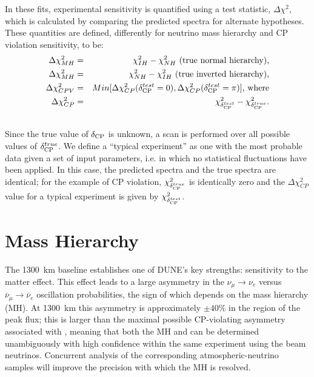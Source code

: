 In these fits, experimental sensitivity is
quantified using a test statistic, $\Delta\chi^2$, which is calculated
by comparing the predicted spectra for alternate hypotheses.
These quantities are defined, differently for neutrino mass hierarchy
and CP violation sensitivity, to be:
\begin{eqnarray}
\Delta\chi^2_{MH} & = & \chi^2_{IH} - \chi^2_{NH}\textrm{ (true normal hierarchy),}\\ 
\Delta\chi^2_{MH} & = & \chi^2_{NH} - \chi^2_{IH}\textrm{ (true inverted hierarchy),}\\
\Delta\chi^2_{CPV} & = & Min[\Delta\chi^2_{CP}(\mdeltacp^{test}=0),\Delta\chi^2_{CP}(\mdeltacp^{test}=\pi)]\textrm{, where} \\
\Delta\chi^2_{CP} & = & \chi^2_{\mdeltacp^{test}} - \chi^2_{\mdeltacp^{true}}. \\ \nonumber
\end{eqnarray}
Since the true value of $\mdeltacp$ is unknown, a scan is  performed over
all possible values of $\mdeltacp^{true}$. 
We define a ``typical experiment'' as one with the most probable data given a set of input parameters, 
i.e. in which no statistical fluctuations have been applied.
In this case, the predicted spectra and the true spectra are identical;
for the example of CP violation, $\chi^2_{\mdeltacp^{true}}$ 
is identically zero and the $\Delta\chi^2_{CP}$ value for a typical experiment is given by 
$\chi^2_{\mdeltacp^{test}}$.

\section{Mass Hierarchy}
\label{sec:physics-lbnosc-mh}

The 1300~km baseline establishes one of DUNE's key strengths: sensitivity to the matter
effect. This effect leads to a large asymmetry in the
$\nu_\mu\to \nu_e$ versus $\overline{\nu}_\mu \to \overline{\nu}_e$
oscillation probabilities, the sign of which depends on the mass
hierarchy (MH).  At 1300~km this asymmetry is approximately
$\pm 40\%$ in the region of the peak flux; this is larger than the
maximal possible CP-violating asymmetry associated with \deltacp,
meaning that both the MH and \deltacp can be
determined unambiguously with high confidence within the same
experiment using the beam neutrinos.  Concurrent analysis of the corresponding atmospheric-neutrino samples will improve the precision with which the
MH is resolved. 

